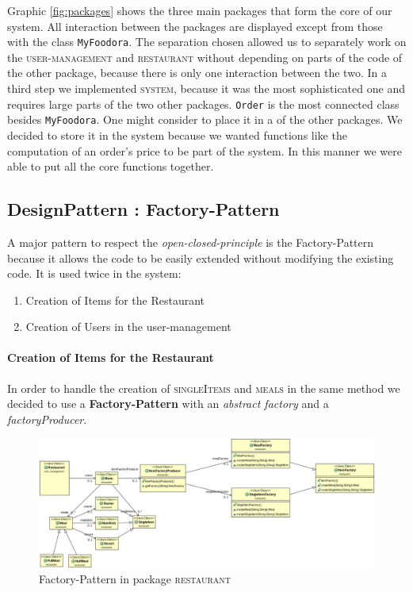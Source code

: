 Graphic \ref{fig:packages} shows the three main packages that form the core of our system. All
interaction between the packages are displayed except from those with the class
\lstinline|MyFoodora|. The separation chosen allowed us to separately work on the
\textsc{user-management} and \textsc{restaurant} without depending on parts of the code of the
other package, because there is only one interaction between the two. In a third step we
implemented \textsc{system}, because it was the most sophisticated one and requires large parts of
the two other packages. \lstinline|Order| is the most connected class besides
\lstinline|MyFoodora|.
One might consider to place it in a of the other packages. We decided to store it in the system
because we wanted functions like the computation of an order's price to be part of the system. In
this manner we were able to put all the core functions together. 

\subsection{DesignPattern : Factory-Pattern}
\label{sub:designpattern_factory_pattern}

A major pattern to respect the \textit{open-closed-principle} is the Factory-Pattern because it
allows the code to be easily extended without modifying the existing code. It is used twice in
the system:
\begin{enumerate}
	\item Creation of Items for the Restaurant
	\item Creation of Users in the user-management
\end{enumerate}

\paragraph{Creation of Items for the Restaurant}

In order to handle the creation of \textsc{singleItems} and \textsc{meals} in the same method we 
decided to use a \textbf{Factory-Pattern} with an \textit{abstract factory} and a
\textit{factoryProducer}. 

\begin{figure}[H]
	\centering
	\includegraphics[width=1\linewidth]{./ima/restaurant_factory_pattern.jpg}
	\caption{Factory-Pattern in package \textsc{restaurant}}
	\label{fig:restaurant-factory-pattern}
\end{figure}

